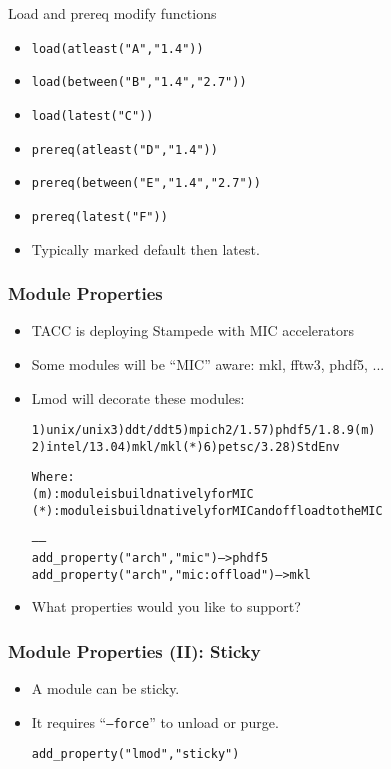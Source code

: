 \documentclass[dvipsnames,aspectratio=169]{beamer}
\begin{document}
\begin{frame}{Load and prereq modify functions}
  \begin{itemize}
    \item \texttt{load(atleast("A","1.4"))}
    \item \texttt{load(between("B","1.4","2.7"))}
    \item \texttt{load(latest("C"))}
    \item \texttt{prereq(atleast("D","1.4"))}
    \item \texttt{prereq(between("E","1.4","2.7"))}
    \item \texttt{prereq(latest("F"))}
    \item Typically marked default then latest.
  \end{itemize}
\end{frame}

\begin{frame}[fragile]
    \frametitle{Module Properties}
  \begin{itemize}
    \item TACC is deploying Stampede with MIC accelerators
    \item Some modules will be ``MIC'' aware: mkl, fftw3, phdf5, ...
    \item Lmod will decorate these modules:
  {\tiny
    \begin{alltt}
  1) unix/unix     3) ddt/ddt       5) mpich2/1.5    7) phdf5/1.8.9 {\color{blue}(m)}
  2) intel/13.0    4) mkl/mkl {\color{red}(*)}   6) petsc/3.2     8) StdEnv

  Where:
   {\color{blue}(m)}:  module is build natively for MIC
   {\color{red}(*)}:  module is build natively for MIC and offload to the MIC

   ------
   add_property("arch","mic")              -- \textgreater phdf5
   add_property("arch","mic:offload")      -- \textgreater mkl
    \end{alltt}
}
  \item What properties would you like to support?
  \end{itemize}
\end{frame}


\begin{frame}[fragile]
    \frametitle{Module Properties (II): Sticky}
  \begin{itemize}
    \item A module can be sticky.
    \item It requires ``\texttt{--force}'' to unload or purge.
    {\small
\begin{alltt}
    add\_property("lmod","sticky")
\end{alltt}
}
  \end{itemize}
\end{frame}
\end{document}
